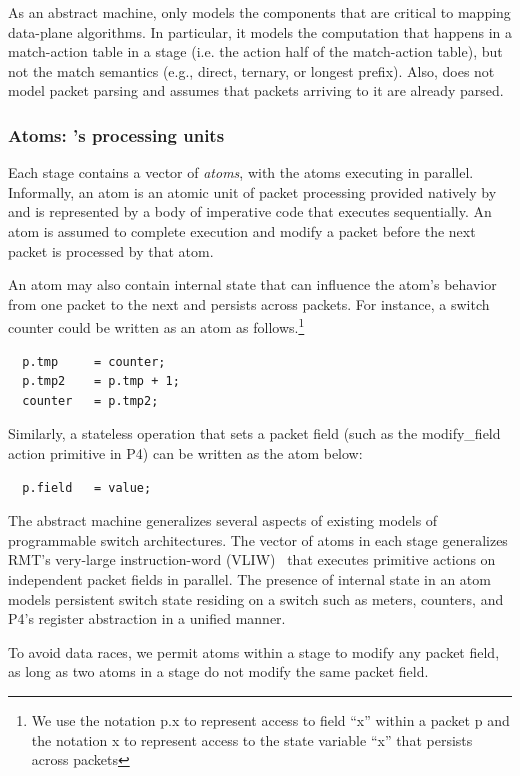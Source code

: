 As an abstract machine, \absmachine only models the components that
are critical to mapping data-plane algorithms. In particular, it
models the computation that happens in a match-action table in a stage
(i.e. the action half of the match-action table), but not the match
semantics (e.g., direct, ternary, or longest prefix). Also,
\absmachine does not model packet parsing and assumes that packets
arriving to it are already parsed.


\subsubsection{Atoms: \absmachine's processing units}

Each stage contains a vector of \textit{atoms}, with the atoms
executing in parallel. Informally, an atom is an atomic unit of packet
processing provided natively by \absmachine and is represented by a body of imperative code that
executes sequentially. An atom is assumed to complete execution and
modify a packet before the next packet is processed by that
atom.

An atom may also contain internal state that can influence the atom's
behavior from one packet to the next and persists across packets. For
instance, a switch counter could be written as an atom as
follows.\footnote{We use the notation p.x to represent access to field
  ``x'' within a packet p and the notation x to represent access to
  the state variable ``x'' that persists across packets}
\begin{verbatim}
  p.tmp     = counter;
  p.tmp2    = p.tmp + 1;
  counter   = p.tmp2;
\end{verbatim}
Similarly, a stateless operation that sets a packet field (such as the
modify\_field action primitive in P4) can be written as the atom
below:
\begin{verbatim}
  p.field   = value;
\end{verbatim}

The \absmachine abstract machine generalizes several aspects of
existing models of programmable switch architectures. The vector of
atoms in each stage generalizes RMT's very-large instruction-word
(VLIW)~\cite{rmt} that executes primitive actions on independent
packet fields in parallel. The presence of internal state in an atom
models persistent switch state residing on a switch such as meters,
counters, and P4's register abstraction in a unified manner.

\smallskip
{}
 To avoid data races, we permit atoms within a stage to modify any packet
 field, as long as two atoms in a stage do not modify the same packet field.

